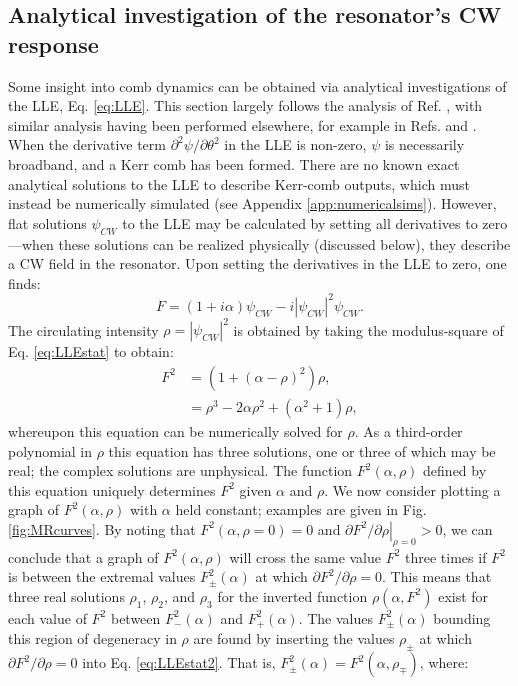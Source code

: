 %

\subsection{Analytical investigation of the resonator's CW response}\label{sec:MRanalyticalcurves}
Some insight into comb dynamics can be obtained via analytical investigations of the LLE, Eq. \ref{eq:LLE}. This section largely follows the analysis of Ref. \cite{Godey2014}, with similar analysis having been performed elsewhere, for example in Refs. \cite{Coen2013a} and \cite{Barashenkov1996}. When the derivative term $\partial^2\psi/\partial\theta^2$ in the LLE is non-zero, $\psi$ is necessarily broadband, and a Kerr comb has been formed. There are no known exact analytical solutions to the LLE to describe Kerr-comb outputs, which must instead be numerically simulated (see Appendix \ref{app:numericalsims}). However, flat solutions $\psi_{CW}$ to the LLE  may be calculated by setting all derivatives to zero---when these solutions can be realized physically (discussed below), they describe a CW field in the resonator. Upon setting the derivatives in the LLE to zero, one finds:
\begin{equation}
F=(1+i\alpha)\psi_{CW}-i|\psi_{CW}|^2\psi_{CW}. \label{eq:LLEstat}
\end{equation}
The circulating intensity $\rho=|\psi_{CW}|^2$ is obtained by taking the modulus-square of Eq. \ref{eq:LLEstat} to obtain:
\begin{align}
F^2&=\left(1+(\alpha-\rho)^2\right)\rho\label{eq:LLEstat2},\\
&=\rho^3-2\alpha\rho^2+(\alpha^2+1)\rho,
\end{align} 
whereupon this equation can be numerically solved for $\rho$. As a third-order polynomial in $\rho$ this equation has three solutions, one or three of which may be real; the complex solutions are unphysical. The function $F^2(\alpha,\rho)$ defined by this equation uniquely determines $F^2$ given $\alpha$ and $\rho$. We now consider plotting a graph of $F^2(\alpha,\rho)$ with $\alpha$ held constant; examples are given in Fig. \ref{fig:MRcurves}. By noting that $F^2(\alpha,\rho=0)=0$ and $\left.\partial F^2/\partial \rho\right|_{\rho=0}>0$, we can conclude that a graph of $F^2(\alpha,\rho)$ will cross the same value $F^2$ three times if $F^2$ is between the extremal values $F^2_\pm(\alpha)$ at which $\partial F^2/\partial\rho=0$. This means that three real solutions $\rho_1$, $\rho_2$, and $\rho_3$ for the inverted function $\rho(\alpha,F^2)$ exist for each value of $F^2$ between $F^2_-(\alpha)$ and $F^2_+(\alpha)$. The values $F^2_\pm(\alpha)$ bounding  this region of degeneracy in $\rho$ are found by inserting the values $\rho_\pm$ at which $\partial F^2/\partial\rho=0$ into Eq. \ref{eq:LLEstat2}. That is, $F^2_\pm(\alpha)=F^2(\alpha,\rho_\mp)$, where:
